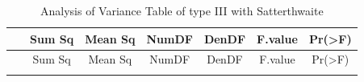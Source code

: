 \documentclass[]{article}
\theoremstyle{definition}
\theoremstyle{definition}
\theoremstyle{definition}
\theoremstyle{remark}
\begin{document}
\begin{longtable}[]{@{}ccccccc@{}}
\caption{Analysis of Variance Table of type III with
Satterthwaite}\tabularnewline
\toprule
\begin{minipage}[b]{0.22\columnwidth}\centering\strut
~\strut
\end{minipage} & \begin{minipage}[b]{0.09\columnwidth}\centering\strut
Sum Sq\strut
\end{minipage} & \begin{minipage}[b]{0.10\columnwidth}\centering\strut
Mean Sq\strut
\end{minipage} & \begin{minipage}[b]{0.08\columnwidth}\centering\strut
NumDF\strut
\end{minipage} & \begin{minipage}[b]{0.08\columnwidth}\centering\strut
DenDF\strut
\end{minipage} & \begin{minipage}[b]{0.10\columnwidth}\centering\strut
F.value\strut
\end{minipage} & \begin{minipage}[b]{0.12\columnwidth}\centering\strut
Pr(\textgreater{}F)\strut
\end{minipage}\tabularnewline
\midrule
\endfirsthead
\toprule
\begin{minipage}[b]{0.22\columnwidth}\centering\strut
~\strut
\end{minipage} & \begin{minipage}[b]{0.09\columnwidth}\centering\strut
Sum Sq\strut
\end{minipage} & \begin{minipage}[b]{0.10\columnwidth}\centering\strut
Mean Sq\strut
\end{minipage} & \begin{minipage}[b]{0.08\columnwidth}\centering\strut
NumDF\strut
\end{minipage} & \begin{minipage}[b]{0.08\columnwidth}\centering\strut
DenDF\strut
\end{minipage} & \begin{minipage}[b]{0.10\columnwidth}\centering\strut
F.value\strut
\end{minipage} & \begin{minipage}[b]{0.12\columnwidth}\centering\strut
Pr(\textgreater{}F)\strut
\end{minipage}\tabularnewline
\midrule
\endhead
\begin{minipage}[t]{0.22\columnwidth}\centering\strut

\end{minipage}
\end{longtable}
\end{document}
